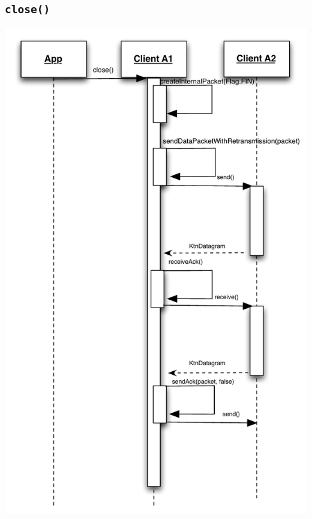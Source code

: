 \documentclass{article}
\begin{document}
\subsection{\texttt{close()}}
\includegraphics[scale=0.95]{ktnClientClose.pdf}
\end{document}

